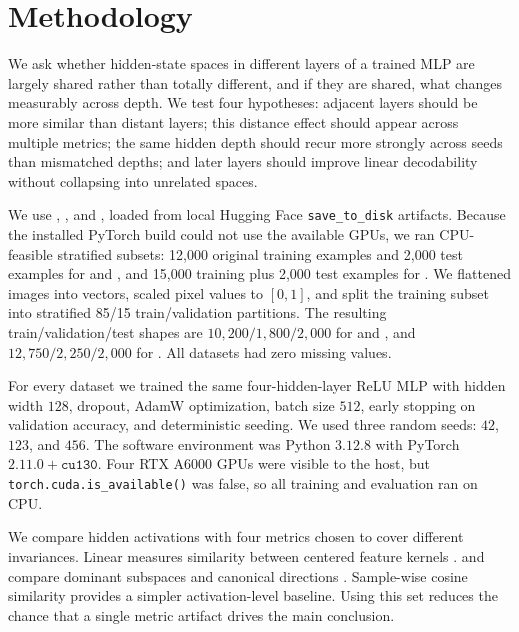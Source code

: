 \section{Methodology}
\label{sec:methodology}

 We ask whether hidden-state spaces in different layers of a trained MLP are largely shared rather than totally different, and if they are shared, what changes measurably across depth. We test four hypotheses: adjacent layers should be more similar than distant layers; this distance effect should appear across multiple metrics; the same hidden depth should recur more strongly across seeds than mismatched depths; and later layers should improve linear decodability without collapsing into unrelated spaces.

 We use \mnist, \fashionmnist, and \cifar, loaded from local Hugging Face \texttt{save\_to\_disk} artifacts. Because the installed PyTorch build could not use the available GPUs, we ran CPU-feasible stratified subsets: 12{,}000 original training examples and 2{,}000 test examples for \mnist and \fashionmnist, and 15{,}000 training plus 2{,}000 test examples for \cifar. We flattened images into vectors, scaled pixel values to $[0,1]$, and split the training subset into stratified 85/15 train/validation partitions. The resulting train/validation/test shapes are $10{,}200/1{,}800/2{,}000$ for \mnist and \fashionmnist, and $12{,}750/2{,}250/2{,}000$ for \cifar. All datasets had zero missing values.

 For every dataset we trained the same four-hidden-layer ReLU MLP with hidden width $128$, dropout, AdamW optimization, batch size $512$, early stopping on validation accuracy, and deterministic seeding. We used three random seeds: $42$, $123$, and $456$. The software environment was Python $3.12.8$ with PyTorch $2.11.0{+}\texttt{cu130}$. Four RTX A6000 GPUs were visible to the host, but \texttt{torch.cuda.is\_available()} was false, so all training and evaluation ran on CPU.

 We compare hidden activations with four metrics chosen to cover different invariances. Linear \cka measures similarity between centered feature kernels \cite{kornblith2019similarity}. \svcca and \pwcca compare dominant subspaces and canonical directions \cite{raghu2017svcca}. Sample-wise cosine similarity provides a simpler activation-level baseline. Using this set reduces the chance that a single metric artifact drives the main conclusion.

